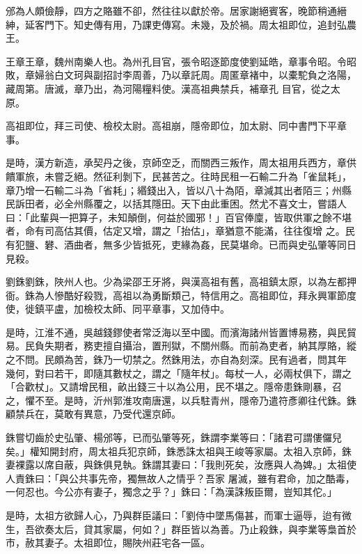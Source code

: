 \begin{pinyinscope}
 邠為人頗儉靜，四方之賂雖不卻，然往往以獻於帝。居家謝絕賓客，晚節稍通縉紳，延客門下。知史傳有用，乃課吏傳寫。未幾，及於禍。周太祖即位，追封弘農王。



 王章王章，魏州南樂人也。為州孔目官，張令昭逐節度使劉延皓，章事令昭。令昭敗，章婦翁白文珂與副招討李周善，乃以章託周。周匿章褚中，以橐駝負之洛陽，藏周第。唐滅，章乃出，為河陽糧料使。漢高祖典禁兵，補章孔
 目官，從之太原。



 高祖即位，拜三司使、檢校太尉。高祖崩，隱帝即位，加太尉、同中書門下平章事。



 是時，漢方新造，承契丹之後，京師空乏，而關西三叛作，周太祖用兵西方，章供饋軍旅，未嘗乏絕。然征利剝下，民甚苦之。往時民租一石輸二升為「雀鼠耗」，章乃增一石輸二斗為「省耗」；緡錢出入，皆以八十為陌，章減其出者陌三；州縣民訴田者，必全州縣覆之，以括其隱田。天下由此重困。然尤不喜文士，嘗語人曰：「此輩與一把算子，未知顛倒，何益於國邪！」百官俸廩，皆取供軍之餘不堪者，命有司高估其價，估定又增，謂之「抬估」，章猶意不能滿，往往復增
 之。民有犯鹽、礬、酒曲者，無多少皆抵死，吏緣為姦，民莫堪命。已而與史弘肇等同日見殺。



 劉銖劉銖，陜州人也。少為梁邵王牙將，與漢高祖有舊，高祖鎮太原，以為左都押衙。銖為人慘酷好殺戮，高祖以為勇斷類己，特信用之。高祖即位，拜永興軍節度使，徙鎮平盧，加檢校太師、同平章事，又加侍中。



 是時，江淮不通，吳越錢鏐使者常泛海以至中國。而濱海諸州皆置博易務，與民貿易。民負失期者，務吏擅自攝治，置刑獄，不關州縣。而前為吏者，納其厚賂，縱之不問。民頗為苦，銖乃一切禁之。然銖用法，亦自為刻深。民有過者，問其年
 幾何，對曰若干，即隨其數杖之，謂之「隨年杖」。每杖一人，必兩杖俱下，謂之「合歡杖」。又請增民租，畝出錢三十以為公用，民不堪之。隱帝患銖剛暴，召之，懼不至。是時，沂州郭淮攻南唐還，以兵駐青州，隱帝乃遣符彥卿往代銖。銖顧禁兵在，莫敢有異意，乃受代還京師。



 銖嘗切齒於史弘肇、楊邠等，已而弘肇等死，銖謂李業等曰：「諸君可謂僂儸兒矣。」權知開封府，周太祖兵犯京師，銖悉誅太祖與王峻等家屬。太祖入京師，銖妻裸露以席自蔽，與銖俱見執。銖謂其妻曰：「我則死矣，汝應與人為婢。」太祖使人責銖曰：「與公共事先帝，獨無故人之情乎？吾家
 屠滅，雖有君命，加之酷毒，一何忍也。今公亦有妻子，獨念之乎？」銖曰：「為漢誅叛臣爾，豈知其佗。」



 是時，太祖方欲歸人心，乃與群臣議曰：「劉侍中墜馬傷甚，而軍士逼辱，迨有微生，吾欲奏太后，貸其家屬，何如？」群臣皆以為善。乃止殺銖，與李業等梟首於市，赦其妻子。太祖即位，賜陜州莊宅各一區。




\end{pinyinscope}
